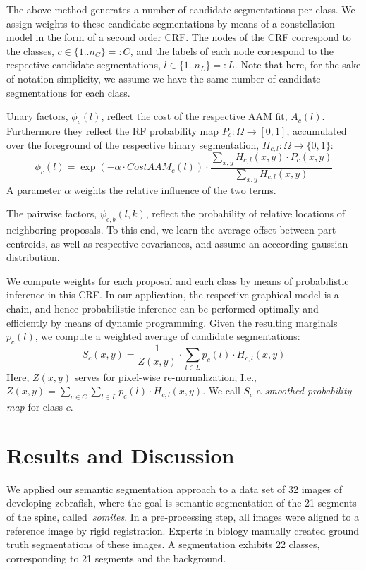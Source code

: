 \documentclass[10pt,twocolumn,letterpaper]{article}
\begin{document}
The above method generates a number of candidate segmentations per class. 
%
We assign weights to these candidate segmentations by means of a constellation model in the form of a second order CRF. 
%
The nodes of the CRF correspond to the classes, $c\in \{1..n_C\}=:C$, and the labels of each node correspond to the respective candidate segmentations, $l\in \{1..n_L\}=:L$. 
Note that here, for the sake of notation simplicity, we assume we have the same number of candidate segmentations for each class. 

Unary factors, $\phi_c(l)$, reflect the cost of the respective AAM fit, $A_c(l)$. Furthermore they reflect the RF probability map $P_c:\Omega\rightarrow [ 0,1 ]$, accumulated over the foreground of the respective binary segmentation, $H_{c,l}: \Omega\rightarrow \{0,1\}$: 
\begin{equation}
\phi_c(l) = \exp{(-\alpha\cdot CostAAM_c(l))} \cdot \frac{\sum_{x,y} H_{c,l}(x,y)\cdot P_c(x,y)}{\sum_{x,y} H_{c,l}(x,y)}
\label{eq:unaries}
\end{equation}
A parameter $\alpha$ weights the relative influence of the two terms. 

The pairwise factors, $\psi_{c,b}(l,k)$, reflect the probability of relative locations of neighboring proposals. To this end, we learn the average offset between part centroids, as well as respective covariances, and assume an acccording gaussian distribution. 

We compute weights for each proposal and each class by means of probabilistic inference in this CRF. In our application, the respective graphical model is a chain, and hence probabilistic inference can be performed optimally and efficiently by means of dynamic programming. 
%
Given the resulting marginals $p_c(l)$, we compute a weighted average of candidate segmentations: 
\begin{equation}
 S_c(x,y) = \frac{1}{Z(x,y)} \cdot \sum_{l\in L} p_c(l)\cdot H_{c,l}(x,y) 
\label{eq:weighting}
\end{equation}
%
Here, $Z(x,y)$ serves for pixel-wise re-normalization; I.e., $Z(x,y)=\sum_{c\in C}\sum_{l\in L} p_c(l)\cdot H_{c,l}(x,y)$.
%
We call $S_c$ a \emph{smoothed probability map} for class $c$. 

\section{Results and Discussion}

We applied our semantic segmentation approach to a data set of 32 images of developing zebrafish, where the goal is semantic segmentation of the 21 segments of the spine, called~\emph{somites}. In a pre-processing step, all images were aligned to a reference image by rigid registration. Experts in biology manually created ground truth segmentations of these images. A segmentation exhibits 22 classes, corresponding to 21 segments and the background. 
\end{document}

